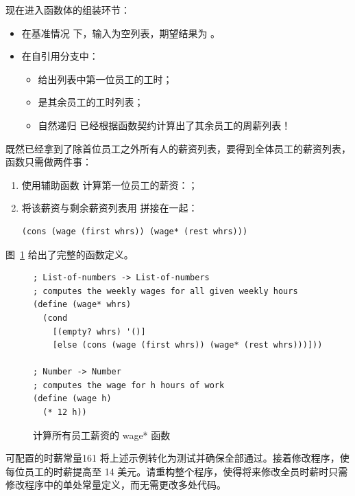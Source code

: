 现在进入函数体的组装环节：
\begin{itemize}
  \item 在基准情况  下，输入为空列表，期望结果为 。
  \item 在自引用分支中：
    \begin{itemize}
      \item {} 给出列表中第一位员工的工时；
      \item {} 是其余员工的工时列表；
      \item 自然递归  已经根据函数契约计算出了其余员工的周薪列表！
    \end{itemize}
\end{itemize}

既然已经拿到了除首位员工之外所有人的薪资列表，要得到全体员工的薪资列表，函数只需做两件事：
\begin{enumerate}
  \item 使用辅助函数  计算第一位员工的薪资：；
  \item 将该薪资与剩余薪资列表用  拼接在一起：
\begin{lstlisting}[language=BSL]
(cons (wage (first whrs)) (wage* (rest whrs)))
\end{lstlisting}
\end{enumerate}

图~\ref{fig:wage_star_definition} 给出了完整的函数定义。

\begin{figure}[htbp]
  \centering
\begin{lstlisting}[language=BSL, basicstyle=\scriptsize\ttfamily]
; List-of-numbers -> List-of-numbers
; computes the weekly wages for all given weekly hours
(define (wage* whrs)
  (cond
    [(empty? whrs) '()]
    [else (cons (wage (first whrs)) (wage* (rest whrs)))]))

; Number -> Number
; computes the wage for h hours of work
(define (wage h)
  (* 12 h))
\end{lstlisting}
  \caption{计算所有员工薪资的 wage* 函数}
  \label{fig:wage_star_definition}
\end{figure}

\begin{exercise}{可配置的时薪常量}{161}
将上述示例转化为测试并确保全部通过。接着修改程序，使每位员工的时薪提高至 14 美元。请重构整个程序，使得将来修改全员时薪时只需修改程序中的单处常量定义，而无需更改多处代码。
\end{exercise}

